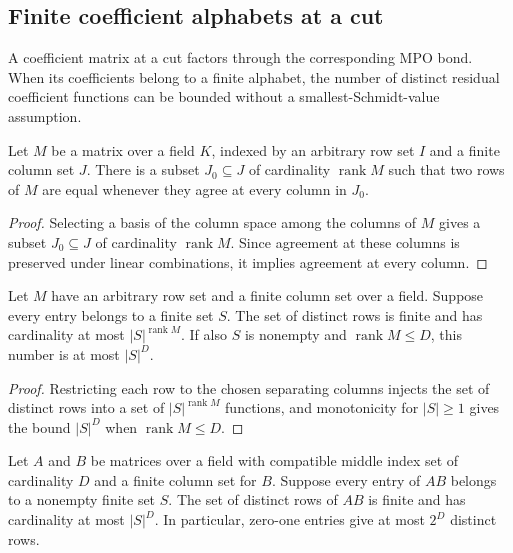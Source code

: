 \subsection{Finite coefficient alphabets at a cut}

A coefficient matrix at a cut factors through the corresponding MPO bond.
When its coefficients belong to a finite alphabet, the number of distinct
residual coefficient functions can be bounded without a smallest-Schmidt-value
assumption.

\begin{lemma}
    \label{thm:mpu_cut_row_separator}
    \leanok
    Let $M$ be a matrix over a field $K$, indexed by an arbitrary row set
    $I$ and a finite column set $J$. There is a subset $J_0\subseteq J$ of
    cardinality $\operatorname{rank}M$ such that two rows of $M$ are equal
    whenever they agree at every column in $J_0$.
\end{lemma}

\begin{proof}\leanok
    Selecting a basis of the column space among the columns of $M$ gives a
    subset $J_0\subseteq J$ of cardinality $\operatorname{rank}M$. Since
    agreement at these columns is preserved under linear combinations, it
    implies agreement at every column.
\end{proof}

\begin{lemma}
    \label{thm:mpu_cut_finite_alphabet_rows}
    \leanok
    Let $M$ have an arbitrary row set and a finite column set over a field.
    Suppose every entry belongs to a finite set $S$. The set of distinct
    rows is finite and has cardinality at most $|S|^{\operatorname{rank}M}$.
    If also $S$ is nonempty and $\operatorname{rank}M\leq D$, this number
    is at most $|S|^D$.
\end{lemma}

\begin{proof}\leanok
    Restricting each row to the chosen separating columns injects the set
    of distinct rows into a set of $|S|^{\operatorname{rank}M}$ functions,
    and monotonicity for $|S|\geq1$ gives the bound $|S|^D$ when
    $\operatorname{rank}M\leq D$.
\end{proof}

\begin{lemma}
    \label{thm:mpu_cut_bond_row_count}
    \leanok
    Let $A$ and $B$ be matrices over a field with compatible middle index set
    of cardinality $D$ and a finite column set for $B$. Suppose every entry
    of $AB$ belongs to a nonempty finite set $S$. The set of distinct rows
    of $AB$ is finite and has cardinality at most $|S|^D$.
    In particular, zero-one entries give at most $2^D$ distinct rows.
\end{lemma}

